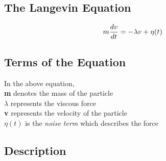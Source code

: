 

\subsection{The Langevin Equation}
\begin{equation}
	{\LARGE{{m \frac{dv}{dt} = -\lambda v + \eta(t)}}}
	\label{eq:1}
\end{equation}
\subsection{Terms of the Equation}

{\normalsize{In the above equation,}}\\
{\normalsize {\textbf{m} denotes the mass of the particle }}\\
{\normalsize {\textbf{$ \lambda $ } represents the viscous force }}\\
{\normalsize {\textbf{v} represents the velocity of the particle }}\\
{\normalsize {\textbf{$  \eta (t)$} is the \textit{noise term} which describes the force}}\\

\subsection{Description}

